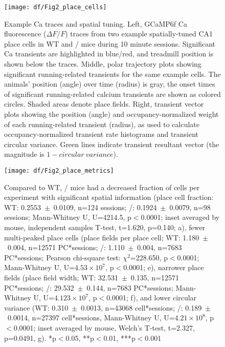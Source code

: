 \begin{figure}
	\centering
	\texttt{[image: df/Fig2\_place\_cells]}
	\caption[Example Ca traces and spatial tuning]{Example Ca traces and spatial tuning. Left, GCaMP6f Ca fluorescence ($\Delta F/F$) traces from two example spatially-tuned CA1 place cells in WT and \df/ mice during 10 minute sessions. Significant Ca transients are highlighted in blue/red, and treadmill position is shown below the traces.
	Middle, polar trajectory plots showing significant running-related transients for the same example cells. The animals' position (angle) over time (radius) is gray, the onset times of significant running-related calcium transients are shown as colored circles. Shaded areas denote place fields. 
	Right, transient vector plots showing the position (angle) and occupancy-normalized weight of each running-related transient (radius), as used to calculate occupancy-normalized transient rate histograms and transient circular variance. Green lines indicate transient resultant vector (the magnitude is $1 - circular~variance$).}
	\label{fig:df:place_cells}
\end{figure}

\begin{figure}
	\centering
	\texttt{[image: df/Fig2\_place\_metrics]}
	\caption[Comparison of place cell metrics]{Compared to WT, \df/ mice had a decreased fraction of cells per experiment with significant spatial information (place cell fraction: WT: 0.2553~$\pm$~0.0109, n=124 sessions; \df/: 0.1924~$\pm$~0.0079, n=98 sessions; Mann-Whitney U, U=4214.5, p$<$0.0001; inset averaged by mouse, independent samples T-test, t=1.620, p=0.140; a), fewer multi-peaked place cells (place fields per place cell; WT: 1.180~$\pm$~0.004, n=12571 PC*sessions; \df/: 1.110~$\pm$~0.004, n=7683 PC*sessions; Pearson chi-square test: $\chi^2$=228.650, p$<$0.0001; Mann-Whitney U, U=$4.53\times10^7$, p$<$0.0001; e), narrower place fields (place field width; WT: 32.531~$\pm$~0.135, n=12571 PC*sessions; \df/: 29.532~$\pm$~0.144, n=7683 PC*sessions; Mann-Whitney U, U=$4.123\times10^7$, p$<$0.0001; f), and lower circular variance (WT: 0.310~$\pm$~0.0013, n=43068 cell*sessions; \df/: 0.189~$\pm$~0.0014, n=27397 cell*sessions, Mann-Whitney U, U=$4.21\times10^8$, p$<$0.0001; inset averaged by mouse, Welch's T-test, t=2.327, p=0.0491, g). *p$<$0.05, **p$<$0.01, ***p$<$0.001}
	\label{fig:df:place_metrics}
\end{figure}


